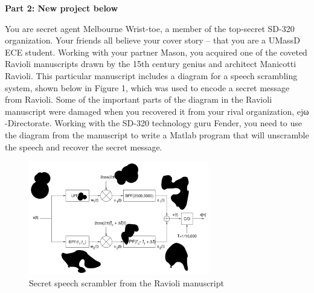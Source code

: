 \begin{LARGE}
  \textbf{Part 2: New project below}
\end{LARGE}

\hspace*{\fill}

You are secret agent Melbourne Wrist-toe, a member of the top-secret SD-320 organization. Your friends all believe your cover story – that you are a UMassD ECE student. Working with your partner Mason, you acquired one of the coveted Ravioli manuscripts drawn by the 15th century genius and architect Manicotti Ravioli. This particular manuscript includes a diagram for a speech scrambling system, shown below in Figure 1, which was used to encode a secret message from Ravioli. Some of the important parts of the diagram in the Ravioli manuscript were damaged when you recovered it from your rival organization, ejω -Directorate. Working with the SD-320 technology guru Fender, you need to use the diagram from the manuscript to write a Matlab program that will unscramble the speech and recover the secret message.


\begin{figure}[!htbp]
  \centering
    \includegraphics[width=0.7\textwidth]{Part2/Question/Ravioli.png}
  \caption{Secret speech scrambler from the Ravioli manuscript}
\end{figure}

